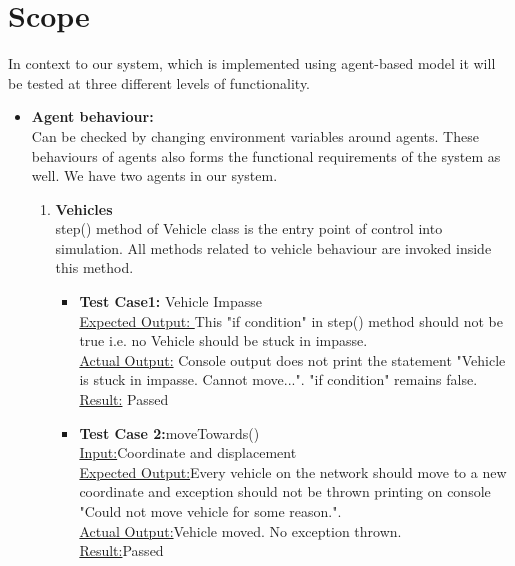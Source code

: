 \documentclass[11pt, oneside]{article}   	%
\begin{document}
\section{Scope}
	In context to our system, which is implemented using agent-based model it will be tested at three different levels of functionality.

\begin{itemize}
	\subsection{Levels of Functionalities}
	\item \textbf{Agent behaviour: }\hfill \\
	Can be checked by changing environment variables around agents. These behaviours of agents also forms the functional requirements of the system as well. We have two agents in our system. \begin{enumerate}

	\item \textbf{Vehicles}\hfill \\
	step() method of Vehicle class is the entry point of control into simulation. All methods related to vehicle behaviour are invoked inside this method.\hfill \\

	\begin{itemize}
	\item \textbf{Test Case1:} Vehicle Impasse\hfill \\
		\underline{Expected Output: }This "if condition" in step() method should not be true i.e. no Vehicle 	should be stuck in impasse.\hfill \\
		\underline{Actual Output:} Console output does not print the statement "Vehicle is stuck in 		impasse. Cannot move...". "if condition" remains false.\hfill \\
		\underline{Result:} Passed\hfill \\

	\item \textbf{Test Case 2:}moveTowards()\hfill \\
		\underline{Input:}Coordinate and displacement\hfill \\
		\underline{Expected Output:}Every vehicle on the network should move to a new coordinate and exception should not be thrown printing on console "Could not move vehicle for some reason.".	\hfill \\
		 \underline{Actual Output:}Vehicle moved. No exception thrown.\hfill \\
		\underline{Result:}Passed
	

\end{itemize}
\end{enumerate}
\end{itemize}
\end{document}
